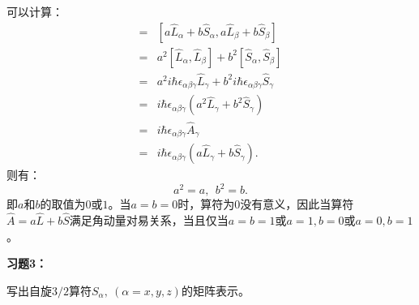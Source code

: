 \documentclass[reqno,a4paper,12pt]{amsart}
\begin{document}
\begin{tcolorbox}[breakable, colback = black!5!white, colframe = black]
可以计算：
\begin{align*}
	[\hat{A}_\alpha, \hat{A}_\beta] =& [a\hat{L}_\alpha+b\hat{S}_\alpha, a\hat{L}_\beta+b\hat{S}_\beta] \\
	=& a^2[\hat{L}_\alpha, \hat{L}_\beta] + b^2[\hat{S}_\alpha, \hat{S}_\beta] \\
	=& a^2 i\hbar \epsilon_{\alpha\beta\gamma} \hat{L}_\gamma + b^2 i\hbar \epsilon_{\alpha\beta\gamma} \hat{S}_\gamma \\
	=& i\hbar\epsilon_{\alpha\beta\gamma} (a^2\hat{L}_\gamma+b^2\hat{S}_\gamma) \\
	=& i\hbar\epsilon_{\alpha\beta\gamma} \hat{A}_\gamma \\
	=& i\hbar\epsilon_{\alpha\beta\gamma} (a\hat{L}_\gamma+b\hat{S}_\gamma).
\end{align*}
则有：
\[
	a^2 = a, \ \ b^2 = b.
\]
即$a$和$b$的取值为$0$或$1$。当$a=b=0$时，算符为$0$没有意义，因此当算符$\hat{A} = a\hat{L}+b\hat{S}$满足角动量对易关系，当且仅当$a=b=1$或$a=1,b=0$或$a=0,b=1$。
\end{tcolorbox}

\textbf{习题3：}

写出自旋$3/2$算符$S_\alpha, \ (\alpha = x, y, z)$的矩阵表示。
\end{document}
